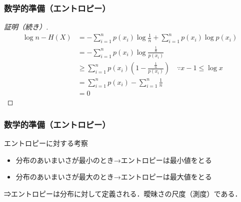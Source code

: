 \documentclass{classes/myslide}
\begin{document}
\begin{frame}\frametitle{数学的準備（エントロピー）}
  \begin{proof}[証明（続き）]
    \begin{align*}
      \log n - H(X) 
      &= -\sum_{i = 1}^{n} p(x_i) \log \frac{1}{n} + \sum_{i = 1}^{n} p(x_i) \log p(x_i) \\
      &= -\sum_{i = 1}^n p(x_i) \log \frac{\frac{1}{n}}{p(x_i)} \\
      &\geq \sum_{i = 1}^n p(x_i) \left( 1 - \frac{\frac{1}{n}}{p(x_i)}\right)\quad \because x - 1 \leq \log x \\
      &= \sum_{i = 1}^n p(x_i) - \sum_{i = 1}^{n} \frac{1}{n} \\
      &= 0
    \end{align*}
  \end{proof}
\end{frame}

\begin{frame}\frametitle{数学的準備（エントロピー）}
  \begin{alertblock}{エントロピーに対する考察}
    \begin{itemize}
      \item 分布のあいまいさが最小のとき→エントロピーは最小値をとる
      \item 分布のあいまいさが最大のとき→エントロピーは最大値をとる
    \end{itemize}
    ⇒エントロピーは分布に対して定義される．曖昧さの尺度（測度）である．
  \end{alertblock}
\end{frame}
\end{document}
